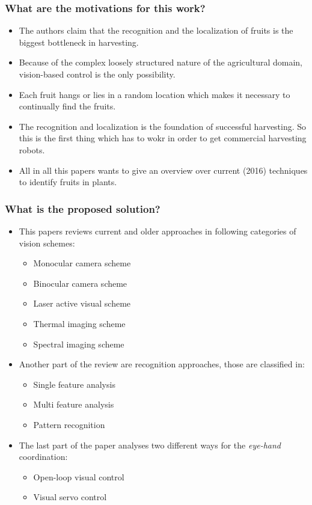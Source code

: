 \documentclass{article}
\begin{document}
\subsubsection*{What are the motivations for this work?}
\begin{itemize}
    \item The authors claim that the recognition and the localization of fruits is the biggest bottleneck in harvesting.
    \item Because of the complex loosely structured nature of the agricultural domain, vision-based control is the only possibility.
    \item Each fruit hangs or lies in a random location which makes it necessary to continually find the fruits. 
    \item The recognition and localization is the foundation of successful harvesting. So this is the first thing which has to wokr in order to get commercial harvesting robots. 
    \item All in all this papers wants to give an overview over current (2016) techniques to identify fruits in plants.
\end{itemize}
\subsubsection*{What is the proposed solution?}
\begin{itemize}
    \item This papers reviews current and older approaches in following categories of vision schemes:
    \begin{itemize}
        \item Monocular camera scheme
        \item Binocular camera scheme
        \item Laser active visual scheme
        \item Thermal imaging scheme
        \item Spectral imaging scheme
    \end{itemize} 
    \item Another part of the review are recognition approaches, those are classified in:
    \begin{itemize}
        \item Single feature analysis
        \item Multi feature analysis
        \item Pattern recognition 
    \end{itemize}
    \item The last part of the paper analyses two different ways for the \emph{eye-hand} coordination:
    \begin{itemize}
        \item Open-loop visual control
        \item Visual servo control
    \end{itemize} 
\end{itemize}
\end{document}
